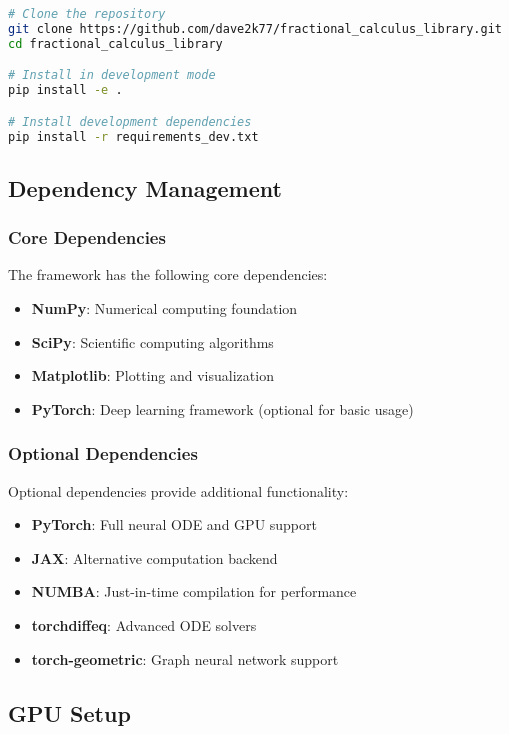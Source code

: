 \begin{lstlisting}[language=bash, caption=Source Installation]
# Clone the repository
git clone https://github.com/dave2k77/fractional_calculus_library.git
cd fractional_calculus_library

# Install in development mode
pip install -e .

# Install development dependencies
pip install -r requirements_dev.txt
\end{lstlisting}

\subsection{Dependency Management}

\subsubsection{Core Dependencies}
The framework has the following core dependencies:
\begin{itemize}
    \item \textbf{NumPy}: Numerical computing foundation
    \item \textbf{SciPy}: Scientific computing algorithms
    \item \textbf{Matplotlib}: Plotting and visualization
    \item \textbf{PyTorch}: Deep learning framework (optional for basic usage)
\end{itemize}

\subsubsection{Optional Dependencies}
Optional dependencies provide additional functionality:
\begin{itemize}
    \item \textbf{PyTorch}: Full neural ODE and GPU support
    \item \textbf{JAX}: Alternative computation backend
    \item \textbf{NUMBA}: Just-in-time compilation for performance
    \item \textbf{torchdiffeq}: Advanced ODE solvers
    \item \textbf{torch-geometric}: Graph neural network support
\end{itemize}

\subsection{GPU Setup}

